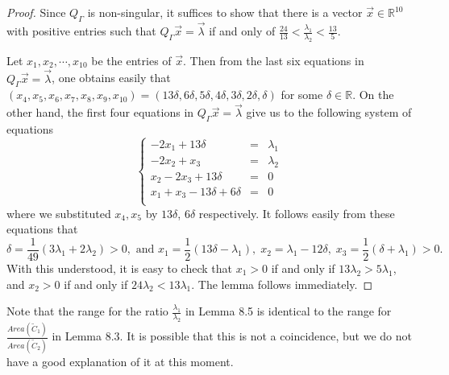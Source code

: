 \documentclass[11pt]{amsart}
\theoremstyle{plain}
\numberwithin{theorem}{section}
\theoremstyle{definition}
\newcommand{\R}{{\mathbb R}}
\begin{document}
\begin{proof}
Since $Q_\Gamma$ is non-singular, it suffices to show that there is a vector $\vec{x}\in\R^{10}$ with positive entries such that $Q_\Gamma \vec{x}=\vec{\lambda}$ if and only of $\frac{24}{13}<\frac{\lambda_1}{\lambda_2}<\frac{13}{5}$.

Let $x_1,x_2,\cdots,x_{10}$ be the entries of $\vec{x}$. Then from the last six equations in 
$Q_\Gamma \vec{x}=\vec{\lambda}$, one obtains easily that
$(x_4,x_5,x_6,x_7,x_8,x_9,x_{10})=(13\delta, 6\delta,  5\delta,  4\delta,  3\delta,  2\delta,  \delta)$ for some
$\delta\in\R$. On the other hand, the first four equations in $Q_\Gamma \vec{x}=\vec{\lambda}$ give us to the following system of equations
$$
\left \{\begin{array}{lll}
-2x_1+ 13\delta &=& \lambda_1\\
-2x_2+x_3 & = & \lambda_2\\
x_2-2x_3+ 13\delta & = & 0\\
x_1+x_3-13\delta+6\delta & = & 0\\
\end{array}
\right. 
$$
where we substituted $x_4,x_5$ by $13\delta$, $6\delta$ respectively. It follows easily from these equations that
$$
\delta=\frac{1}{49}(3\lambda_1+2\lambda_2)>0, \mbox{ and } x_1=\frac{1}{2} (13\delta-\lambda_1),\;  x_2=\lambda_1-12\delta, \; x_3=\frac{1}{2}(\delta+\lambda_1)>0.
$$
With this understood, it is easy to check that $x_1>0$ if and only if $13\lambda_2>5\lambda_1$, and  $x_2>0$ 
 if and only if $24\lambda_2<13\lambda_1$. The lemma follows immediately.
 
\end{proof}
 
 Note that the range for the ratio $\frac{\lambda_1}{\lambda_2}$ in Lemma 8.5 is identical to the range for 
 $\frac{Area(\tilde{C}_1)}{Area(\tilde{C}_2)}$ in Lemma 8.3. It is possible that this is not a coincidence, but we do not have a good explanation of it at this moment. 

\vspace{2mm}
\end{document}
